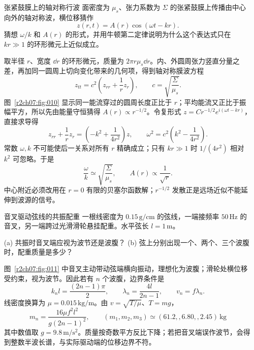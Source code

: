 \begin{practicebox}{张紧鼓膜上的轴对称行波}
面密度为 $\mu_s$、张力系数为 $\Sigma$ 的张紧鼓膜上传播由中心向外的轴对称波，横位移猜作
\[
 z(r,t)=A(r)\cos(\omega t-kr).
\]
猜想 $\omega/k$ 和 $A(r)$ 的形式，并用牛顿第二定律说明为什么这个表达式只在 $kr\gg1$ 的环形微元上近似成立。
\label{r2ch07:pr:003}
\begin{solution}
取半径 $r$、宽度 $\dd r$ 的环形微元，质量为 $2\pi r\mu_s\dd r$。内、外圆周张力竖直分量之差，再加同一圆周上切向变化带来的几何项，得到轴对称膜波方程
\begin{equation}
 z_{tt}=c^2\left(z_{rr}+\frac1r z_r\right),\qquad
 c=\sqrt{\frac\Sigma{\mu_s}}.
 \label{r2ch07:eq:032}
\end{equation}
图~\ref{r2ch07:fig:010} 显示同一能流穿过的圆周长度正比于 $r$；平均能流又正比于振幅平方，所以先由能量守恒猜得 $A(r)\propto r^{-1/2}$。令复形式
$z=C r^{-1/2}e^{i(\omega t-kr)}$，直接求导得
\begin{equation}
 z_{rr}+\frac1r z_r=\left(-k^2+\frac1{4r^2}\right)z,\qquad
 \omega^2=c^2\left(k^2-\frac1{4r^2}\right).
 \label{r2ch07:eq:033}
\end{equation}
常数 $\omega,k$ 不可能使后一关系对所有 $r$ 精确成立；只有 $kr\gg1$ 时 $1/(4r^2)$ 相对 $k^2$ 可忽略。于是
\[
 \boxed{\frac\omega k\simeq\sqrt{\frac\Sigma{\mu_s}}},\qquad
 \boxed{A(r)\propto\frac1{\sqrt r}}.
\]
中心附近必须改用在 $r=0$ 有限的贝塞尔函数解；$r^{-1/2}$ 发散正是远场近似不能延伸到波源的信号。
\figRadialMembrane
\end{solution}
\end{practicebox}

\begin{practicebox}{音叉驱动弦线的共振配重}
一根线密度为 $0.15\,\mathrm{g/cm}$ 的弦线，一端接频率 $50\,\mathrm{Hz}$ 的音叉，另一端跨过光滑滑轮悬挂配重。水平弦长 $l=1\,\mathrm m$。

(a) 共振时音叉端应视为波节还是波腹？
(b) 弦上分别出现一个、两个、三个波腹时，配重质量是多少？
\label{r2ch07:pr:004}
\begin{solution}
图~\ref{r2ch07:fig:011} 中音叉主动带动弦端横向振动，理想化为波腹；滑轮处横位移受约束，视为波节。因此若有 $n$ 个波腹，边界条件是
\begin{equation}
 k_nl=\frac{(2n-1)\pi}{2},\qquad
 \lambda_n=\frac{4l}{2n-1},\qquad
 v_n=f\lambda_n.
 \label{r2ch07:eq:034}
\end{equation}
线密度换算为 $\mu=0.015\,\mathrm{kg/m}$。由 $v=\sqrt{T/\mu}$、$T=mg$，
\begin{equation}
 \boxed{m_n=\frac{16\mu f^2l^2}{g(2n-1)^2}},\qquad
 (m_1,m_2,m_3)\simeq(61.2,,6.80,,2.45)\,\mathrm{kg}
 \label{r2ch07:eq:035}
\end{equation}
其中数值取 $g=9.8\,\mathrm{m/s^2}$。质量按奇数平方反比下降；若把音叉端误作波节，会得到整数半波长谱，与实际驱动端的位移边界不符。
\figSonometer
\end{solution}
\end{practicebox}

